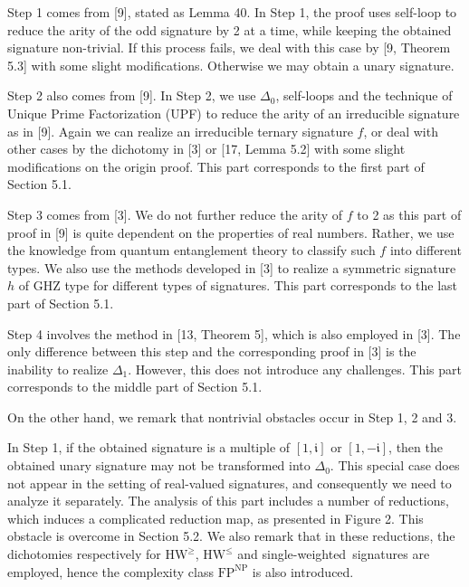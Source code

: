 Step 1 comes from [9], stated as Lemma 40. In Step 1, the proof uses self-loop to reduce the arity of the odd signature by 2 at a time, while keeping the obtained signature non-trivial. If this process fails, we deal with this case by [9, Theorem 5.3] with some slight modifications. Otherwise we may obtain a unary signature.\par




Step 2 also comes from [9]. In Step 2, we use $\Delta_{0}$, self-loops and the technique of Unique Prime Factorization (UPF) to reduce the arity of an irreducible signature as in [9]. Again we can realize an irreducible ternary signature $f$, or deal with other cases by the dichotomy in [3] or [17, Lemma 5.2] with some slight modifications on the origin proof. This part corresponds to the first part of Section 5.1.\par




Step 3 comes from [3]. We do not further reduce the arity of $f$ to 2 as this part of proof in [9] is quite dependent on the properties of real numbers. Rather, we use the knowledge from quantum entanglement theory to classify such $f$ into different types. We also use the methods developed in [3] to realize a symmetric signature $h$ of GHZ type for different types of signatures. This part corresponds to the last part of Section 5.1.\par




Step 4 involves the method in [13, Theorem 5], which is also employed in [3]. The only difference between this step and the corresponding proof in [3] is the inability to realize $\Delta_{1}$. However, this does not introduce any challenges. This part corresponds to the middle part of Section 5.1.\par




On the other hand, we remark that nontrivial obstacles occur in Step 1, 2 and 3.\par




In Step 1, if the obtained signature is a multiple of $[1,\mathfrak{i}]$ or $[1,-\mathfrak{i}]$, then the obtained unary signature may not be transformed into $\Delta_{0}$. This special case does not appear in the setting of real-valued signatures, and consequently we need to analyze it separately. The analysis of this part includes a number of reductions, which induces a complicated reduction map, as presented in Figure 2. This obstacle is overcome in Section 5.2. We also remark that in these reductions, the dichotomies respectively for $\text{HW}^{\geq}$, $\text{HW}^{\leq}$ and single-weighted signatures are employed, hence the complexity class $\text{FP}^{\text{NP}}$ is also introduced.\par




